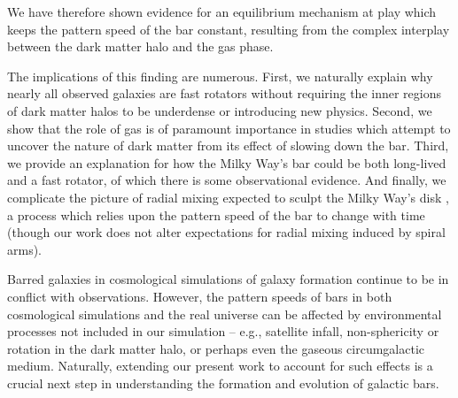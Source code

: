 \documentclass{natureprintstyle}
\begin{document}
We have therefore shown evidence for an equilibrium mechanism at play which
keeps the pattern speed of the bar constant, resulting from the complex
interplay between the dark matter halo and the gas phase.

The implications of this finding are numerous. First, we naturally explain why
nearly all observed galaxies are fast rotators without requiring the inner
regions of dark matter halos to be underdense\cite{1998ApJ...493L...5D,
2000ApJ...543..704D} or introducing new physics.\cite{2021MNRAS.503.2833R,
2021MNRAS.508..926R} Second, we show that the role of gas is of paramount
importance in studies which attempt to uncover the nature of dark matter from
its effect of slowing down the bar.\cite{2021MNRAS.500.4710C,
2021MNRAS.505.2412C} Third, we provide an explanation for how the Milky Way's
bar could be both long-lived and a fast rotator, of which there is some
observational evidence.\cite{2019MNRAS.490.4740B} And finally, we complicate
the picture of radial mixing expected to sculpt the Milky Way's disk
\cite{2012MNRAS.420..913B, 2015ApJ...808..132H}, a process which relies upon
the pattern speed of the bar to change with time (though our work does not
alter expectations for radial mixing induced by spiral arms\cite{2002MNRAS.336..785S}).

Barred galaxies in cosmological simulations of galaxy formation continue to be
in conflict with observations.\cite{2017MNRAS.469.1054A, 2019MNRAS.483.2721P,
2021AA...650L..16F} However, the pattern speeds of bars in both cosmological
simulations and the real universe can be affected by environmental processes
not included in our simulation -- e.g., satellite
infall\cite{2011Natur.477..301P}, non-sphericity\cite{2013MNRAS.429.1949A} or
rotation\cite{2013MNRAS.434.1287S, 2014ApJ...783L..18L, 2018MNRAS.476.1331C,
2019MNRAS.488.5788C} in the dark matter halo, or perhaps even the gaseous
circumgalactic medium. Naturally, extending our present work to account for
such effects is a crucial next step in understanding the formation and
evolution of galactic bars.
\end{document}
